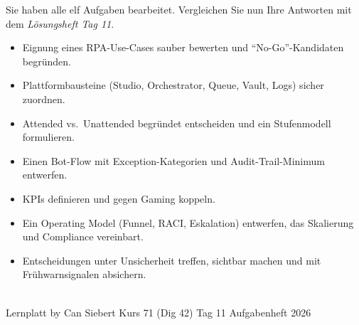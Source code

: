 \documentclass[11pt,a4paper,oneside]{article}
\begin{document}
\noindent Sie haben alle elf Aufgaben bearbeitet. Vergleichen Sie nun Ihre Antworten mit dem \emph{L\"osungsheft Tag 11}.

\medskip
\begin{infobox}
\begin{itemize}
  \item Eignung eines RPA-Use-Cases sauber bewerten und ``No-Go''-Kandidaten begr\"unden.
  \item Plattformbausteine (Studio, Orchestrator, Queue, Vault, Logs) sicher zuordnen.
  \item Attended vs.\ Unattended begr\"undet entscheiden und ein Stufenmodell formulieren.
  \item Einen Bot-Flow mit Exception-Kategorien und Audit-Trail-Minimum entwerfen.
  \item KPIs definieren \textendash{} und gegen Gaming koppeln.
  \item Ein Operating Model (Funnel, RACI, Eskalation) entwerfen, das Skalierung und Compliance vereinbart.
  \item Entscheidungen unter Unsicherheit treffen, sichtbar machen und mit Fr\"uhwarnsignalen absichern.
\end{itemize}
\end{infobox}

\vspace{1cm}
\noindent{\color{lpAccent}\rule{\linewidth}{0.6pt}}\\[4pt]
{\footnotesize\sffamily\color{lpGray}Lernplatt \textperiodcentered{} by Can Siebert \textperiodcentered{} Kurs 71 (Dig 42) \textperiodcentered{} Tag 11 \textperiodcentered{} Aufgabenheft \textperiodcentered{} \textcopyright{} 2026}
\end{document}
